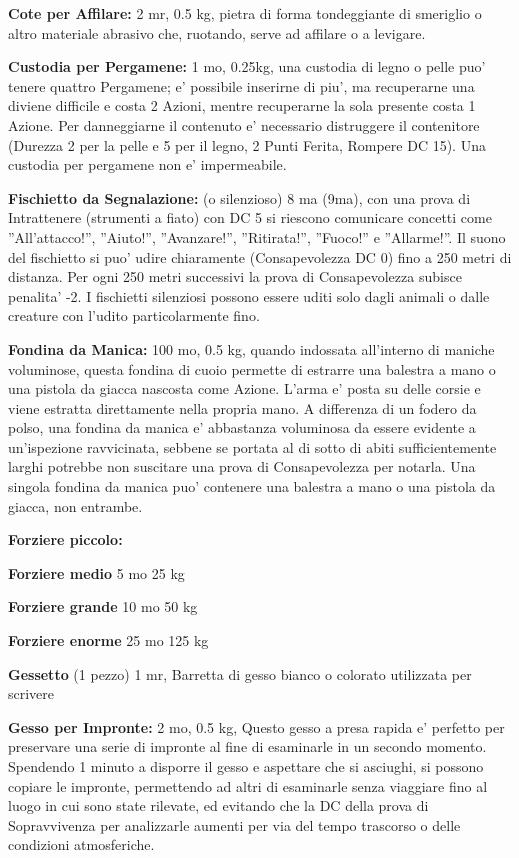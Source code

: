 \documentclass[a4paper,11pt,twoside,openany]{book}
\begin{document}
{\textbf{Cote per Affilare:} 2 mr, 0.5 kg, pietra di forma tondeggiante di smeriglio o altro materiale abrasivo che, ruotando, serve ad affilare o a levigare.

\textbf{Custodia per Pergamene:} 1 mo, 0.25kg, una custodia di legno o pelle puo' tenere quattro Pergamene; e' possibile inserirne di piu', ma recuperarne una diviene difficile e costa 2 Azioni, mentre recuperarne la sola presente costa 1 Azione. Per danneggiarne il contenuto e' necessario distruggere il contenitore (Durezza 2 per la pelle e 5 per il legno, 2 Punti Ferita, Rompere DC 15). Una custodia per pergamene non e' impermeabile.

\textbf{Fischietto da Segnalazione:} (o silenzioso) 8 ma (9ma), con una prova di Intrattenere (strumenti a fiato) con DC 5 si riescono comunicare concetti come ''All'attacco!'', ''Aiuto!'', ''Avanzare!'', ''Ritirata!'', ''Fuoco!'' e ''Allarme!''. Il suono del fischietto si puo' udire chiaramente (Consapevolezza DC 0) fino a 250 metri di distanza. Per ogni 250 metri successivi la prova di Consapevolezza subisce penalita' -2. I fischietti silenziosi possono essere uditi solo dagli animali o dalle creature con l'udito particolarmente fino.

\textbf{Fondina da Manica:} 100 mo, 0.5 kg, quando indossata all'interno di maniche voluminose, questa fondina di cuoio permette di estrarre una balestra a mano o una pistola da giacca nascosta come Azione. L'arma e' posta su delle corsie e viene estratta direttamente nella propria mano. A differenza di un fodero da polso, una fondina da manica e' abbastanza voluminosa da essere evidente a un'ispezione ravvicinata, sebbene se portata al di sotto di abiti sufficientemente larghi potrebbe non suscitare una prova di Consapevolezza per notarla. Una singola fondina da manica puo' contenere una balestra a mano o una pistola da giacca, non entrambe.

\textbf{Forziere piccolo:}

\textbf{Forziere medio} 5 mo 25 kg

\textbf{Forziere grande} 10 mo 50 kg

\textbf{Forziere enorme} 25 mo 125 kg

\textbf{Gessetto} (1 pezzo) 1 mr, Barretta di gesso bianco o colorato utilizzata per scrivere

\textbf{Gesso per Impronte:} 2 mo, 0.5 kg, Questo gesso a presa rapida e' perfetto per preservare una serie di impronte al fine di esaminarle in un secondo momento. Spendendo 1 minuto a disporre il gesso e aspettare che si asciughi, si possono copiare le impronte, permettendo ad altri di esaminarle senza viaggiare fino al luogo in cui sono state rilevate, ed evitando che la DC della prova di Sopravvivenza per analizzarle aumenti per via del tempo trascorso o delle condizioni atmosferiche. 

}
\end{document}
